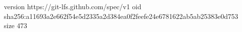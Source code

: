 version https://git-lfs.github.com/spec/v1
oid sha256:a11693a2e662f54e5d2335a2d384ea0f2feefe24e6781622ab5ab25383e0d753
size 473
